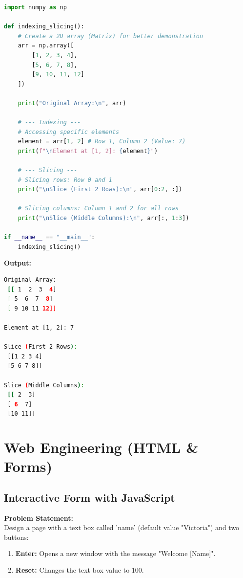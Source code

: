 \documentclass[a4paper,12pt]{article}
\begin{document}
\begin{lstlisting}[language=Python, caption={NumPy Indexing and Slicing}]
import numpy as np

def indexing_slicing():
    # Create a 2D array (Matrix) for better demonstration
    arr = np.array([
        [1, 2, 3, 4],
        [5, 6, 7, 8],
        [9, 10, 11, 12]
    ])
    
    print("Original Array:\n", arr)

    # --- Indexing ---
    # Accessing specific elements
    element = arr[1, 2] # Row 1, Column 2 (Value: 7)
    print(f"\nElement at [1, 2]: {element}")

    # --- Slicing ---
    # Slicing rows: Row 0 and 1
    print("\nSlice (First 2 Rows):\n", arr[0:2, :])

    # Slicing columns: Column 1 and 2 for all rows
    print("\nSlice (Middle Columns):\n", arr[:, 1:3])

if __name__ == "__main__":
    indexing_slicing()
\end{lstlisting}
\vspace{0.5cm}
\textbf{Output:}
\begin{lstlisting}[language=bash]
Original Array:
 [[ 1  2  3  4]
 [ 5  6  7  8]
 [ 9 10 11 12]]

Element at [1, 2]: 7

Slice (First 2 Rows):
 [[1 2 3 4]
 [5 6 7 8]]

Slice (Middle Columns):
 [[ 2  3]
 [ 6  7]
 [10 11]]
\end{lstlisting}


\section{Web Engineering (HTML \& Forms)}

\subsection{Interactive Form with JavaScript}
\textbf{Problem Statement:} \\
Design a page with a text box called 'name' (default value "Victoria") and two buttons:
\begin{enumerate}
    \item \textbf{Enter:} Opens a new window with the message "Welcome [Name]".
    \item \textbf{Reset:} Changes the text box value to 100.
\end{enumerate}
\end{document}
